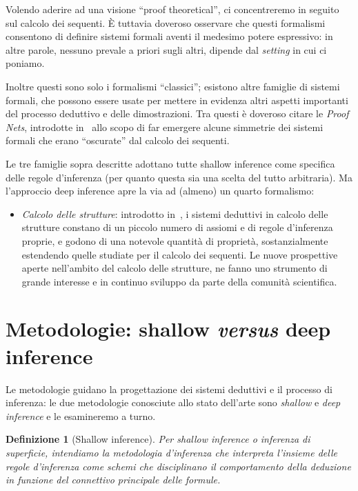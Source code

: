 \documentclass[12pt,a4paper,openright,twoside]{report}
\newtheorem{dfn}[thm]{Definizione}
\begin{document}
Volendo aderire ad una visione ``proof theoretical'', ci concentreremo in seguito sul calcolo dei sequenti. \`E tuttavia doveroso osservare che questi formalismi consentono di definire sistemi formali aventi il medesimo potere espressivo: in altre parole, nessuno prevale a priori sugli altri, dipende dal \emph{setting} in cui ci poniamo. 

Inoltre questi sono solo i formalismi ``classici''; esistono altre famiglie di sistemi formali, che possono essere usate per mettere in evidenza altri aspetti importanti del processo deduttivo e delle dimostrazioni. Tra questi \`e doveroso citare le \emph{Proof Nets}, introdotte in~\cite{Gir87} allo scopo di far emergere alcune simmetrie dei sistemi formali che erano ``oscurate'' dal calcolo dei sequenti.

Le tre famiglie sopra descritte adottano tutte shallow inference come specifica delle regole d'inferenza (per quanto questa sia una scelta del tutto arbitraria). Ma l'approccio deep inference apre la via ad (almeno) un quarto formalismo:
\begin{itemize}
	\item \emph{Calcolo delle strutture}: introdotto in~\cite{Gug02}, i sistemi deduttivi in calcolo delle strutture constano di un piccolo numero di assiomi e di regole d'inferenza proprie, e godono di una notevole quantit\`a di propriet\`a, sostanzialmente estendendo quelle studiate per il calcolo dei sequenti. Le nuove prospettive aperte nell'ambito del calcolo delle strutture, ne fanno uno strumento di grande interesse e in continuo sviluppo da parte della comunit\`a scientifica.
\end{itemize}

\newpage

\section{Metodologie: shallow \emph{versus} deep inference} 
Le metodologie guidano la progettazione dei sistemi deduttivi e il processo di inferenza: le due metodologie conosciute allo stato dell'arte sono \emph{shallow} e \emph{deep inference} e le esamineremo a turno. 

\begin{dfn}[Shallow inference]
Per \emph{shallow inference} o \emph{inferenza di superficie}, intendiamo la \emph{metodologia} d'inferenza che interpreta l'insieme delle regole d'inferenza come \emph{schemi} che disciplinano il comportamento della deduzione \emph{in funzione del connettivo principale} delle formule.
\end{dfn}
\end{document}
